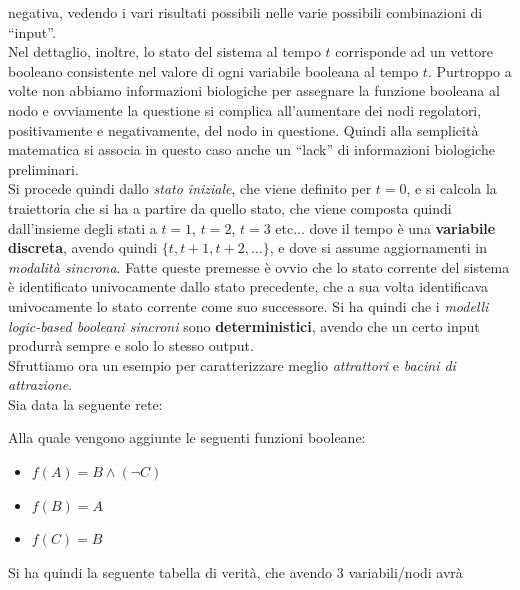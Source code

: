 \documentclass[a4paper,12pt, oneside]{book}
\begin{document}
negativa, vedendo i vari risultati possibili nelle varie possibili combinazioni
di ``input''.\\
Nel dettaglio, inoltre, lo stato del sistema al tempo $t$ corrisponde ad un
vettore booleano consistente nel valore di ogni variabile booleana al tempo
$t$. Purtroppo a volte non abbiamo informazioni biologiche per assegnare la
funzione booleana al nodo e ovviamente la questione si complica all'aumentare
dei nodi regolatori, positivamente e negativamente, del nodo in
questione. Quindi alla semplicità matematica si associa in questo caso anche un
``lack'' di informazioni biologiche preliminari. \\
Si procede quindi dallo \textit{stato iniziale}, che viene definito per $t=0$, e
si calcola la traiettoria che si ha a partire da quello stato, che viene
composta quindi dall'insieme degli stati a $t=1$, $t=2$, $t=3$ etc$\ldots$ dove
il tempo è una \textbf{variabile discreta}, avendo quindi $\{t,
t+1,t+2,\ldots\}$, e dove si assume aggiornamenti in \textit{modalità sincrona}.
Fatte queste premesse è ovvio che lo stato corrente del sistema è identificato
univocamente dallo stato precedente, che a sua volta identificava univocamente
lo stato corrente come suo successore. Si ha quindi che i \textit{modelli
  logic-based booleani sincroni} sono \textbf{deterministici}, avendo che un
certo input produrrà sempre e solo lo stesso output.\\
Sfruttiamo ora un esempio per caratterizzare meglio \textit{attrattori} e
\textit{bacini di attrazione}.\\
Sia data la seguente rete:
\begin{center}
\end{center}
\newpage
\noindent
Alla quale vengono aggiunte le seguenti funzioni booleane:
\begin{itemize}
  \item $f(A)=B\land (\neg C)$
  \item $f(B)=A$
  \item $f(C)=B$
\end{itemize}
Si ha quindi la seguente tabella di verità, che avendo $3$ variabili/nodi avrà
\end{document}
